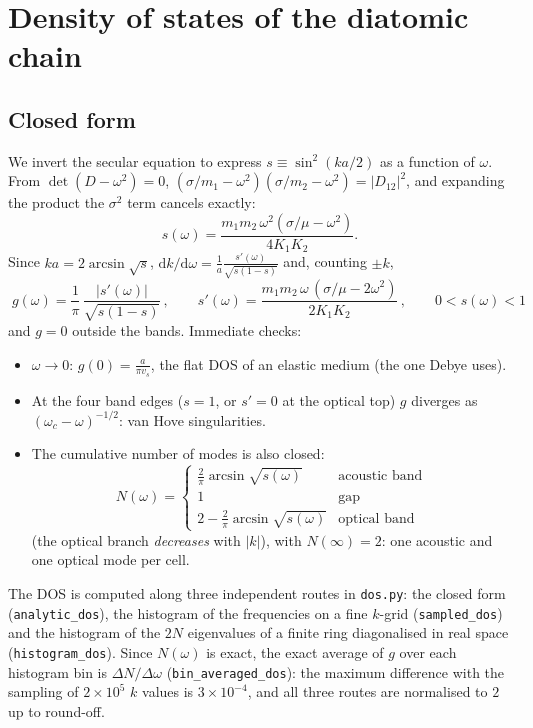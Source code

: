 \documentclass[11pt,a4paper]{article}
\newcommand{\dd}{\mathrm{d}}
\newcommand{\vs}{v_{s}}
\newcommand{\code}[1]{\texttt{#1}}
\begin{document}
\section{Density of states of the diatomic chain}

\subsection{Closed form}

We invert the secular equation to express $s\equiv\sin^2(ka/2)$ as a function
of $\omega$. From $\det(D-\omega^2)=0$,
$(\sigma/m_1-\omega^2)(\sigma/m_2-\omega^2)=|D_{12}|^2$, and expanding the
product the $\sigma^2$ term cancels exactly:
\begin{equation}
s(\omega)=\frac{m_1m_2\,\omega^2\left(\sigma/\mu-\omega^2\right)}{4K_1K_2}.
\end{equation}
Since $ka=2\arcsin\sqrt{s}$, $\dd k/\dd\omega=\frac{1}{a}\frac{s'(\omega)}{\sqrt{s(1-s)}}$
and, counting $\pm k$,
\begin{equation}
\boxed{\;g(\omega)=\frac{1}{\pi}\,\frac{|s'(\omega)|}{\sqrt{s(1-s)}}\,,
\qquad s'(\omega)=\frac{m_1m_2\,\omega\,(\sigma/\mu-2\omega^2)}{2K_1K_2}\,,
\qquad 0<s(\omega)<1\;}
\end{equation}
and $g=0$ outside the bands. Immediate checks:
\begin{itemize}
\item $\omega\to0$: $g(0)=\frac{a}{\pi\vs}$, the flat DOS of an elastic medium
  (the one Debye uses).
\item At the four band edges ($s=1$, or $s'=0$ at the optical top) $g$ diverges
  as $(\omega_c-\omega)^{-1/2}$: van Hove singularities.
\item The cumulative number of modes is also closed:
\begin{equation}
N(\omega)=\begin{cases}
\frac2\pi\arcsin\sqrt{s(\omega)} & \text{acoustic band}\\
1 & \text{gap}\\
2-\frac2\pi\arcsin\sqrt{s(\omega)} & \text{optical band}
\end{cases}
\end{equation}
(the optical branch \emph{decreases} with $|k|$), with $N(\infty)=2$: one
acoustic and one optical mode per cell.
\end{itemize}

\begin{codigo}
The DOS is computed along three independent routes in \code{dos.py}: the closed
form (\code{analytic\_dos}), the histogram of the frequencies on a fine $k$-grid
(\code{sampled\_dos}) and the histogram of the $2N$ eigenvalues of a finite ring
diagonalised in real space (\code{histogram\_dos}). Since $N(\omega)$ is exact,
the exact average of $g$ over each histogram bin is $\Delta N/\Delta\omega$
(\code{bin\_averaged\_dos}): the maximum difference with the sampling of
$2\times10^5$ $k$ values is $3\times10^{-4}$, and all three routes are
normalised to $2$ up to round-off.
\end{codigo}
\end{document}
